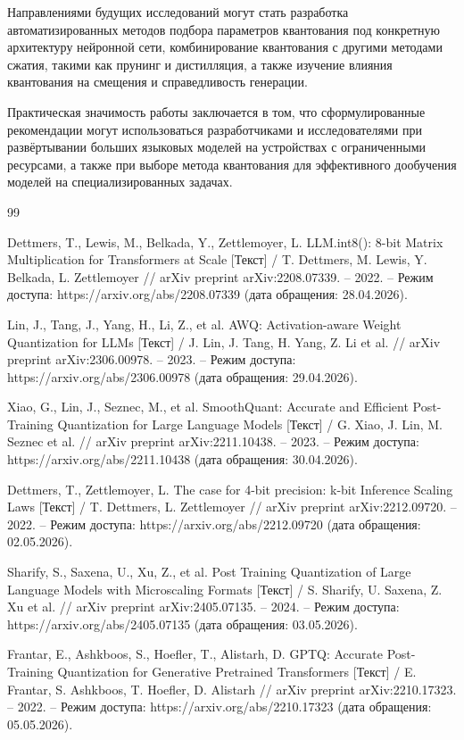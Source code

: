 \documentclass[bachelor, och, coursework]{SCWorks}
\begin{document}
	Направлениями будущих исследований могут стать разработка автоматизированных методов подбора параметров квантования под конкретную архитектуру нейронной сети, комбинирование квантования с другими методами сжатия, такими как прунинг и дистилляция, а также изучение влияния квантования на смещения и справедливость генерации.
	
	Практическая значимость работы заключается в том, что сформулированные рекомендации могут использоваться разработчиками и исследователями при развёртывании больших языковых моделей на устройствах с ограниченными ресурсами, а также при выборе метода квантования для эффективного дообучения моделей на специализированных задачах.
	
	\begin{thebibliography}{99}
		
		 Dettmers, T., Lewis, M., Belkada, Y., Zettlemoyer, L. LLM.int8(): 8-bit Matrix Multiplication for Transformers at Scale [Текст] / T. Dettmers, M. Lewis, Y. Belkada, L. Zettlemoyer // arXiv preprint arXiv:2208.07339. -- 2022. -- Режим доступа: https://arxiv.org/abs/2208.07339 (дата обращения: 28.04.2026).
		
		 Lin, J., Tang, J., Yang, H., Li, Z., et al. AWQ: Activation-aware Weight Quantization for LLMs [Текст] / J. Lin, J. Tang, H. Yang, Z. Li et al. // arXiv preprint arXiv:2306.00978. -- 2023. -- Режим доступа: https://arxiv.org/abs/2306.00978 (дата обращения: 29.04.2026).
		
		 Xiao, G., Lin, J., Seznec, M., et al. SmoothQuant: Accurate and Efficient Post-Training Quantization for Large Language Models [Текст] / G. Xiao, J. Lin, M. Seznec et al. // arXiv preprint arXiv:2211.10438. -- 2023. -- Режим доступа: https://arxiv.org/abs/2211.10438 (дата обращения: 30.04.2026).
		
		 Dettmers, T., Zettlemoyer, L. The case for 4-bit precision: k-bit Inference Scaling Laws [Текст] / T. Dettmers, L. Zettlemoyer // arXiv preprint arXiv:2212.09720. -- 2022. -- Режим доступа: https://arxiv.org/abs/2212.09720 (дата обращения: 02.05.2026).
		
		 Sharify, S., Saxena, U., Xu, Z., et al. Post Training Quantization of Large Language Models with Microscaling Formats [Текст] / S. Sharify, U. Saxena, Z. Xu et al. // arXiv preprint arXiv:2405.07135. -- 2024. -- Режим доступа: https://arxiv.org/abs/2405.07135 (дата обращения: 03.05.2026).
		
		 Frantar, E., Ashkboos, S., Hoefler, T., Alistarh, D. GPTQ: Accurate Post-Training Quantization for Generative Pretrained Transformers [Текст] / E. Frantar, S. Ashkboos, T. Hoefler, D. Alistarh // arXiv preprint arXiv:2210.17323. -- 2022. -- Режим доступа: https://arxiv.org/abs/2210.17323 (дата обращения: 05.05.2026).
		

\end{thebibliography}
\end{document}
